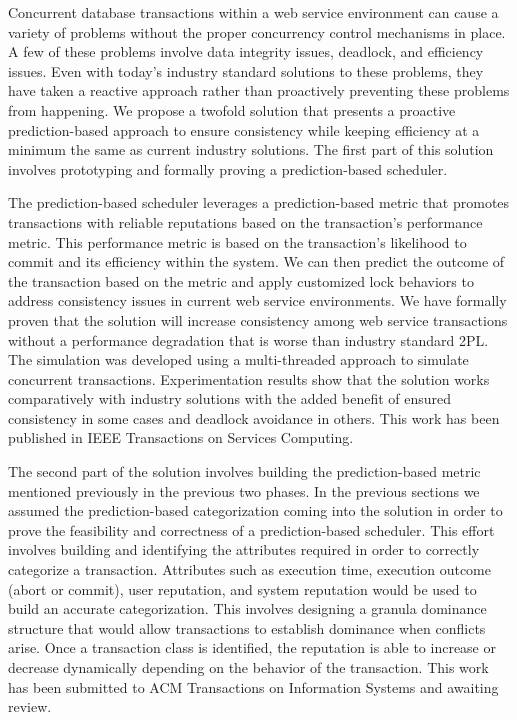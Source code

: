 Concurrent database transactions within a web service environment can cause a variety of problems without the proper concurrency control mechanisms in place. A few of these problems involve data integrity issues, deadlock, and efficiency issues. Even with today's industry standard solutions to these problems, they have taken a reactive approach rather than proactively preventing these problems from happening. We propose a twofold solution that presents a proactive prediction-based approach to ensure consistency while keeping efficiency at a minimum the same as current industry solutions. The first part of this solution involves prototyping and formally proving a prediction-based scheduler.

The prediction-based scheduler leverages a prediction-based metric that promotes transactions with reliable reputations based on the transaction's performance metric. This performance metric is based on the transaction's likelihood to commit and its efficiency within the system. We can then predict the outcome of the transaction based on the metric and apply customized lock behaviors to address consistency issues in current web service environments. We have formally proven that the solution will increase consistency among web service transactions without a performance degradation that is worse than industry standard 2PL. The simulation was developed using a multi-threaded approach to simulate concurrent transactions.  Experimentation  results  show  that the solution works comparatively with industry solutions with the added benefit of ensured consistency in some cases and deadlock avoidance in others. This work has been published in IEEE Transactions on Services Computing.

The second part of the solution involves building the prediction-based metric mentioned previously in the previous two phases. In the previous sections we assumed the prediction-based categorization coming into the solution in order to prove the feasibility and correctness of a prediction-based scheduler. This effort involves building and identifying the attributes required in order to correctly categorize a transaction. Attributes such as execution time, execution outcome (abort or commit), user reputation, and system reputation would be used to build an accurate categorization. This involves designing a granula dominance structure that would allow transactions to establish dominance when conflicts arise. Once a transaction class is identified, the reputation is able to increase or decrease dynamically depending on the behavior of the transaction. This work has been submitted to ACM Transactions on Information Systems and awaiting review.

